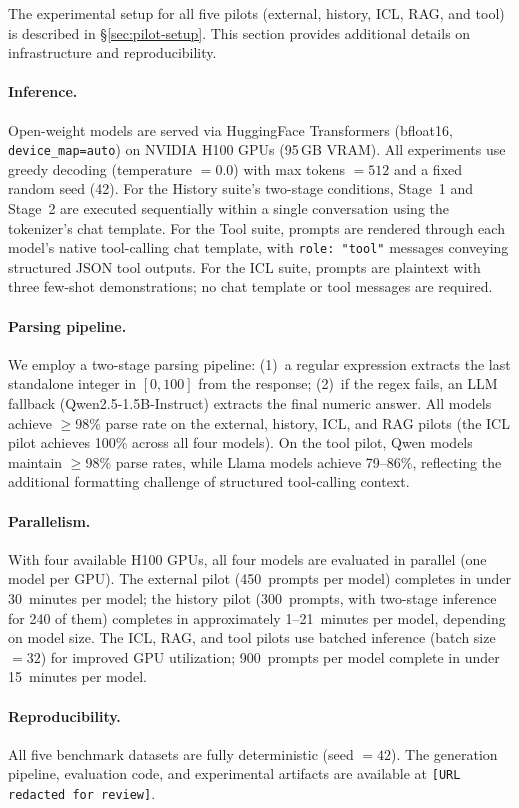The experimental setup for all five pilots (external, history,
ICL, RAG, and tool) is described in \S\ref{sec:pilot-setup}.
This section provides additional details on infrastructure
and reproducibility.

\paragraph{Inference.}
Open-weight models are served via HuggingFace Transformers
(bfloat16, \texttt{device\_map=auto}) on NVIDIA H100 GPUs
(95\,GB VRAM).
All experiments use greedy decoding (temperature $= 0.0$)
with max tokens $= 512$ and a fixed random seed (42).
For the History suite's two-stage conditions, Stage~1 and
Stage~2 are executed sequentially within a single conversation
using the tokenizer's chat template.
For the Tool suite, prompts are rendered through each model's
native tool-calling chat template, with \texttt{role:~"tool"}
messages conveying structured JSON tool outputs.
For the ICL suite, prompts are plaintext with three few-shot
demonstrations; no chat template or tool messages are required.

\paragraph{Parsing pipeline.}
We employ a two-stage parsing pipeline:
(1)~a regular expression extracts the last standalone integer
in $[0, 100]$ from the response;
(2)~if the regex fails, an LLM fallback
(Qwen2.5-1.5B-Instruct) extracts the final numeric answer.
All models achieve $\geq$98\% parse rate on the external,
history, ICL, and RAG pilots (the ICL pilot achieves 100\%
across all four models).
On the tool pilot, Qwen models maintain $\geq$98\% parse
rates, while Llama models achieve 79--86\%, reflecting the
additional formatting challenge of structured tool-calling
context.

\paragraph{Parallelism.}
With four available H100 GPUs, all four models are evaluated
in parallel (one model per GPU).
The external pilot (450~prompts per model) completes in under
30~minutes per model; the history pilot (300~prompts, with
two-stage inference for 240 of them) completes in
approximately 1--21~minutes per model, depending on model size.
The ICL, RAG, and tool pilots use batched inference
(batch size~$= 32$) for improved GPU utilization;
900~prompts per model complete in under 15~minutes per model.

\paragraph{Reproducibility.}
All five benchmark datasets are fully deterministic (seed $= 42$).
The generation pipeline, evaluation code, and experimental
artifacts are available at
\texttt{[URL redacted for review]}.

